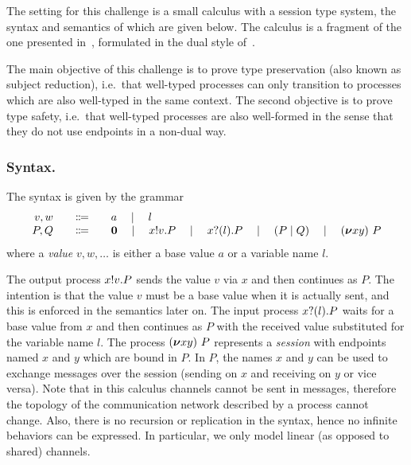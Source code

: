 \documentclass[runningheads]{llncs}
\begin{document}
The setting for this challenge is a small calculus with a session type
system, the syntax and semantics of which are given below. The
calculus is a fragment of the one presented in~\cite{Vasconcelos2012},
formulated in the dual style of~\cite{barber96tr}.

The main objective of this challenge is to prove type preservation (also
known as subject reduction), i.e.\ that well-typed
processes can only transition to processes which are also well-typed
in the same context.
The second objective is to prove type safety, i.e.\ that well-typed processes are also well-formed in the sense that they do not use endpoints in a non-dual way.

\subsubsection{Syntax.}
The syntax is given by the grammar
\[
\begin{array}{r@{\qquad}c@{\qquad}l}
  v,w & \Coloneqq & a \quad\mid\quad l \\
   P,Q & \Coloneqq & \Pend \quad\mid\quad \Pout{x}{v}{P} \quad\mid\quad \Pin{x}{l}{P} \quad\mid\quad \PBpar{P}{Q} \quad\mid\quad  \Presd{x}{y}{P}
\end{array}
\]
where a \emph{value} \( v, w, \dots \) is either a base value \( a \) or a variable name \( l \).

The output process \( x ! v . P \) sends the value \( v \) via \( x \) and then continues as \( P \).
The intention is that the value \( v \) must be a base value when it is actually sent, and this is enforced in the semantics later on.
The input process \( x ? (l) . P \) waits for a base value from \( x \) and then continues as \( P \) with the received value substituted for the variable name \( l \).
%
The process \( (\bm{\nu} xy)~P \) represents a \emph{session} with endpoints named \( x \) and \( y \) which are bound in \( P \). In \( P \), the names \( x \) and \( y \) can be used to exchange messages over the session (sending on \( x \) and receiving on \( y \) or vice versa).
%
%
Note that in this calculus channels cannot be sent in messages, therefore the topology of the communication network described by a process cannot change.
Also, there is no recursion or replication in the syntax, hence no infinite behaviors can be expressed. In particular, we only model linear (as opposed to shared) channels.
\end{document}
